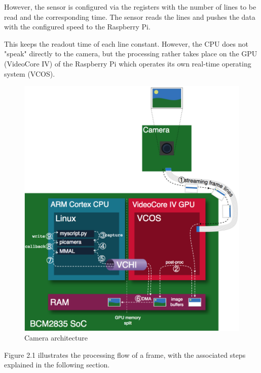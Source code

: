 \documentclass[12pt, a4paper]{report}
\begin{document}
    However, the sensor is configured via the registers with the number of lines to be read and the corresponding time. The sensor reads the lines and pushes the data with the configured speed to the Raspberry Pi.
    
    This keeps the readout time of each line constant. However, the CPU does not "speak" directly to the camera, but the processing rather takes place on the GPU (VideoCore IV) of the Raspberry Pi which operates its own real-time operating system (VCOS).
    
    \bigskip
    \noindent
    \begin{figure}[H]
    \centering
    \includegraphics[scale=0.7]{Images/camera_architecture.png}
    
    \caption{Camera architecture \cite[ch. 6]{ReadTheDocsPicamera}}
    \end{figure}
    \bigskip
    
    Figure 2.1 illustrates the processing flow of a frame, with the associated steps explained in the following section.
    
\end{document}
